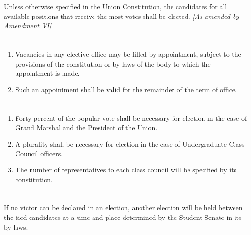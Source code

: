 \documentclass{uniondoc}
\begin{document}
\section{}

Unless otherwise specified in the Union Constitution, the candidates for all available positions that receive the most votes shall be elected. \textit{[As amended by Amendment VI]}

\section{}

\begin{enumerate}
	\item Vacancies in any elective office may be filled by appointment, subject to the provisions of the constitution or by-laws of the body to which the appointment is made.
	\item Such an appointment shall be valid for the remainder of the term of office.
\end{enumerate}

\section{}

\begin{enumerate}
	\item Forty-percent of the popular vote shall be necessary for election in the case of Grand Marshal and the President of the Union.
	\item A plurality shall be necessary for election in the case of Undergraduate Class Council officers.
	\item The number of representatives to each class council will be specified by its constitution.
\end{enumerate}

\section{}

If no victor can be declared in an election, another election will be held between the tied candidates at a time and place determined by the Student Senate in its by-laws.

\section{}
\end{document}
